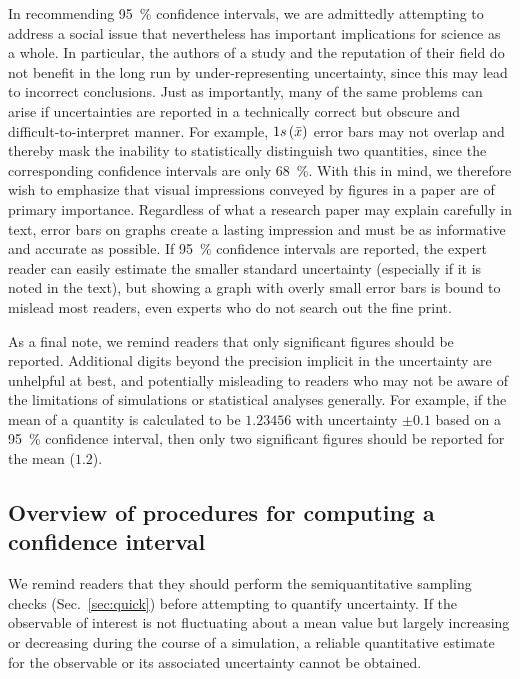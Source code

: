 In recommending 95~\% confidence intervals, we are admittedly attempting to address a social issue that nevertheless has important implications for science as a whole. In particular, the authors of a study and the reputation of their field do not benefit in the long run by under-representing uncertainty, since this may lead to incorrect conclusions. Just as importantly, many of the same problems can arise if uncertainties are reported in a technically correct but obscure and difficult-to-interpret manner. For example, $1s\left( \bar{x} \right)$ error bars may not overlap and thereby mask the inability to statistically distinguish two quantities, since the corresponding confidence intervals are only 68~\%. With this in mind, we therefore wish to emphasize that visual impressions conveyed by figures in a paper are of primary importance. Regardless of what a research paper may explain carefully in text, error bars on graphs create a lasting impression and must be as informative and accurate as possible. If 95~\% confidence intervals are reported, the expert reader can easily estimate the smaller standard uncertainty (especially if it is noted in the text), but showing a graph with overly small error bars is bound to mislead most readers, even experts who do not search out the fine print.

As a final note, we remind readers that only significant figures should be reported.
Additional digits beyond the precision implicit in the uncertainty are unhelpful at best, and potentially misleading to readers who may not be aware of the limitations of simulations or statistical analyses generally.
For example, if the mean of a quantity is calculated to be $1.23456$ with uncertainty $\pm 0.1$ based on a 95~\% confidence interval, then only two significant figures should be reported for the mean ($1.2$).


\subsection{Overview of procedures for computing a confidence interval}
We remind readers that they should perform the semiquantitative sampling checks (Sec.\ \ref{sec:quick}) before attempting to quantify uncertainty.  If the observable of interest is not fluctuating about a mean value but largely increasing or decreasing during the course of a simulation, a reliable quantitative estimate for the observable or its associated uncertainty cannot be obtained.

